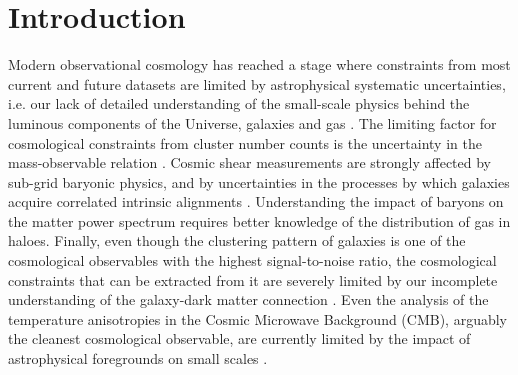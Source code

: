 \documentclass[useAMS,usenatbib]{mn2e}
\begin{document}
\section{Introduction}\label{sec:intro}
  Modern observational cosmology has reached a stage where constraints from most current and future datasets are limited by astrophysical systematic uncertainties, i.e. our lack of detailed understanding of the small-scale physics behind the luminous components of the Universe, galaxies and gas \citep[e.g.][]{2011MNRAS.415.3649V,2011MNRAS.417.2020S,2014JCAP...04..028F,2015MNRAS.454.2451E,2015MNRAS.454.1958M,2015JCAP...12..049S,2019MNRAS.488.1652H,2019JCAP...03..020S,2019OJAp....2E...4C}. The limiting factor for cosmological constraints from cluster number counts is the uncertainty in the mass-observable relation \citep{2009ApJ...692.1060V,2010ApJ...722.1180V,2011ApJ...732...44S,2013JCAP...07..008H,2014MNRAS.440.2077M,2014A&A...571A..20P,2015MNRAS.446.2205M,2016A&A...594A..24P,2016ApJ...832...95D,2019ApJ...878...55B}. Cosmic shear measurements are strongly affected by sub-grid baryonic physics, and by uncertainties in the processes by which galaxies acquire correlated intrinsic alignments \citep[e.g.][]{2001MNRAS.320L...7C,2002MNRAS.332..788M,2004PhRvD..70f3526H,2017MNRAS.465.2033J,2018PhRvD..98d3528T,2018arXiv181206076H,2018ARA&A..56..393M,2019MNRAS.tmp.2187S}. Understanding the impact of baryons on the matter power spectrum requires better knowledge of the distribution of gas in haloes. Finally, even though the clustering pattern of galaxies is one of the cosmological observables with the highest signal-to-noise ratio, the cosmological constraints that can be extracted from it are severely limited by our incomplete understanding of the galaxy-dark matter connection \citep[see e.g.][and references therein]{2018ARA&A..56..435W}. Even the analysis of the temperature anisotropies in the Cosmic Microwave Background (CMB), arguably the cleanest cosmological observable, are currently limited by the impact of astrophysical foregrounds on small scales \citep{2014ApJ...782...74H,2017JCAP...06..031L,2019arXiv190712875P}.
  
\end{document}
